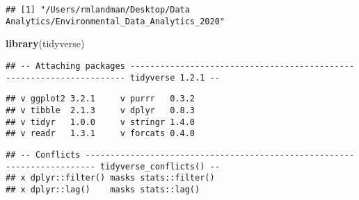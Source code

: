 \documentclass[]{article}
\newenvironment{Shaded}{\begin{snugshade}}{\end{snugshade}}
\newcommand{\CommentTok}[1]{\textcolor[rgb]{0.56,0.35,0.01}{\textit{#1}}}
\newcommand{\KeywordTok}[1]{\textcolor[rgb]{0.13,0.29,0.53}{\textbf{#1}}}
\newcommand{\NormalTok}[1]{#1}
\newcommand{\OperatorTok}[1]{\textcolor[rgb]{0.81,0.36,0.00}{\textbf{#1}}}
\newcommand{\StringTok}[1]{\textcolor[rgb]{0.31,0.60,0.02}{#1}}
\begin{document}
\begin{Shaded}
\end{Shaded}

\begin{verbatim}
## [1] "/Users/rmlandman/Desktop/Data Analytics/Environmental_Data_Analytics_2020"
\end{verbatim}

\begin{Shaded}
\begin{Highlighting}[]
\KeywordTok{library}\NormalTok{(tidyverse)}
\end{Highlighting}
\end{Shaded}

\begin{verbatim}
## -- Attaching packages --------------------------------------------------------------------- tidyverse 1.2.1 --
\end{verbatim}

\begin{verbatim}
## v ggplot2 3.2.1     v purrr   0.3.2
## v tibble  2.1.3     v dplyr   0.8.3
## v tidyr   1.0.0     v stringr 1.4.0
## v readr   1.3.1     v forcats 0.4.0
\end{verbatim}

\begin{verbatim}
## -- Conflicts ------------------------------------------------------------------------ tidyverse_conflicts() --
## x dplyr::filter() masks stats::filter()
## x dplyr::lag()    masks stats::lag()
\end{verbatim}

\begin{Shaded}
\end{Shaded}
\end{document}

